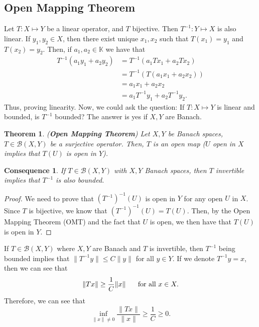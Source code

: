 \documentclass[12pt]{article}
\newtheorem{theorem}{Theorem}
\newtheorem{cons}{Consequence}
\def\K{\mathbb{K}}
\newcommand{\B}{\mathscr{B}}
\newcommand{\lp}{\left(}
\newcommand{\rp}{\right)}
\begin{document}
 \subsection*{Open Mapping Theorem}
 Let $T: X \mapsto Y$ be a linear operator, and $T$ bijective. Then $T^{-1}: Y \mapsto X$ is also linear. If $y_1, y_2 \in X$, then there exist unique $x_1, x_2$ such that $T(x_1) = y_1$ and $T(x_2) = y_2$. Then, if $a_1, a_2 \in \K$ we have that 
 \begin{align*}
 T^{-1}(a_1 y_1 + a_2 y_2) & = T^{-1}(a_1 Tx_1 + a_2 Tx_2) \\
 & = T^{-1}(T(a_1 x_1 + a_2 x_2))\\
 & = a_1 x_1 + a_2 x_2 \\
 & = a_1 T^{-1}y_1 + a_2 T^{-1}y_2.
 \end{align*}
 Thus, proving linearity. Now, we could ask the question: If $T: X \mapsto Y$ is linear and bounded, is $T^{-1}$ bounded? The answer is yes if $X, Y$ are Banach. 
 \begin{theorem} (\textbf{Open Mapping Theorem})
Let $X, Y$ be Banach spaces, $T \in \B(X, Y)$ be a surjective operator. Then, $T$ is an open map ($U$ open in $X$ implies that $T(U)$ is open in $Y$). 
 \end{theorem}
 \begin{cons}
 If $T \in \B(X, Y)$ with $X, Y$ Banach spaces, then $T$ invertible implies that $T^{-1}$ is also bounded.
 \end{cons}
\vspace{-25pt}
 \begin{proof}
 We need to prove that $\lp T^{-1} \rp^{-1} (U)$ is open in $Y$ for any open $U$ in $X$. Since $T$ is bijective, we know that $\lp T^{-1} \rp^{-1} (U) = T(U)$. Then, by the Open Mapping Theorem (OMT) and the fact that $U$ is open, we then have that $T(U)$ is open in $Y$.
 \end{proof}
 \vspace{-25pt}
 If $T \in \B(X, Y)$ where $X, Y$ are Banach and $T$ is invertible, then $T^{-1}$ being bounded implies that $\| T^{-1} y \| \leq C \| y \|$ for all $y \in Y$. If we denote $T^{-1} y = x$, then we can see that 
 \[ \| Tx \| \geq \frac{1}{C} \| x \| \hspace{5mm} \text{ for all } x \in X.\]
 Therefore, we can see that 
 \[\inf\limits_{\| x \| \neq 0} \frac{\| Tx \|}{\| x \|} \geq \frac{1}{C} \geq 0. \]
\end{document}
